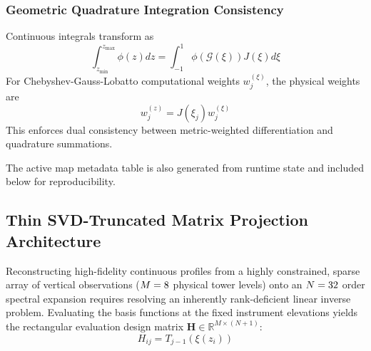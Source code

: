 \documentclass[11pt,a4paper]{article}
\begin{document}
{\subsubsection{Geometric Quadrature Integration Consistency}
Continuous integrals transform as
\begin{equation}
    \int_{z_{\min}}^{z_{\max}} \phi(z) dz = \int_{-1}^{1} \phi\left(\mathcal{G}(\xi)\right) J(\xi) d\xi
\end{equation}
For Chebyshev-Gauss-Lobatto computational weights $w_j^{(\xi)}$, the physical weights are
\begin{equation}
    w_j^{(z)} = J(\xi_j) w_j^{(\xi)}
\end{equation}
This enforces dual consistency between metric-weighted differentiation and quadrature summations.
 }{}

The active map metadata table is also generated from runtime state and included below for reproducibility.



\subsection{Thin SVD-Truncated Matrix Projection Architecture}
\label{sec:methods:svd}

Reconstructing high-fidelity continuous profiles from a highly constrained, sparse array of vertical observations ($M = 8$ physical tower levels) onto an $N=32$ order spectral expansion requires resolving an inherently rank-deficient linear inverse problem. Evaluating the basis functions at the fixed instrument elevations yields the rectangular evaluation design matrix $\mathbf{H} \in \mathbb{R}^{M \times (N+1)}$:
\begin{equation}
H_{ij} = T_{j-1}(\xi(z_i))
\label{eq:h_matrix_def}
\end{equation}
\end{document}
